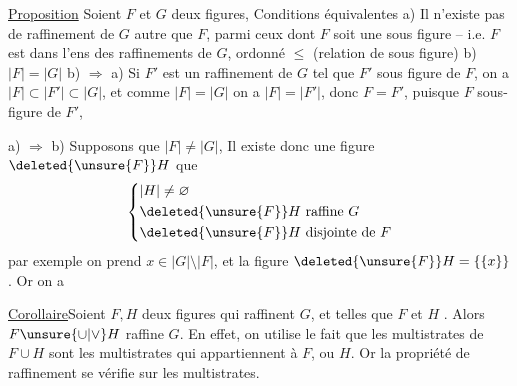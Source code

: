 \uline{Proposition} Soient $F$ et $G$ deux figures,  Conditions équivalentes
a)  Il n'existe pas de raffinement de $G$ autre que $F$, parmi ceux dont $F$ soit une sous figure -- i.e. $F$ est  dans l'ens des raffinements de $G$, ordonné  $\leq$ (relation de sous figure)
b)  $|F|=|G|$ 
b) $\Rightarrow$ a) Si $F'$ est un raffinement de $G$ tel que $F'$ sous figure de $F$, on a $|F|\subset|F'|\subset|G|$, et comme $|F|=|G|$ on
a $|F|=|F'|$, donc $F=F'$, puisque $F$ sous-figure de $F'$,

a) $\Rightarrow$ b) Supposons que $|F|\ne|G|$,  Il existe donc une figure $\deleted{\unsure{F}}H$   que 
\[ \left\{\begin{aligned} &|H|\ne\varnothing\\ &\deleted{\unsure{F}}H\ \text{raffine }G\\ &\deleted{\unsure{F}}H\ \text{disjointe de }F \end{aligned}\right. \]
par exemple on prend  $x\in|G|\setminus|F|$, et la figure $\deleted{\unsure{F}}H=\{\{x\}\}$. Or on a

\uline{Corollaire}\enspace Soient $F,H$ deux figures qui raffinent $G$, et telles que $F$ et $H$  . Alors $F\unsure{\cup|\vee}H$ raffine $G$.
En effet, on utilise le fait que les multistrates de $F\cup H$ sont les multistrates  qui appartiennent à $F$, ou  $H$. Or la propriété de raffinement se vérifie sur les multistrates.

